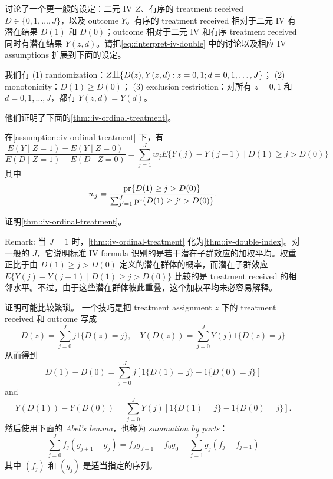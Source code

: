 \citet{angrist1995two} 讨论了一个更一般的设定：二元 IV $Z$、有序的 treatment received $D \in \{0,1,\ldots, J\}$，以及 outcome $Y$。有序的 treatment received 相对于二元 IV 有潜在结果 $D(1)$ 和 $D(0)$；outcome 相对于二元 IV 和有序 treatment received 同时有潜在结果 $Y(z,d)$。请把\cref{eq::interpret-iv-double} 中的讨论以及相应 IV assumptions 扩展到下面的设定。

\begin{assumption}\label{assumption::iv-ordinal-treatment}
我们有
(1) randomization：$Z\ind \{   D(z),  Y(z,d)  : z=0,1; d = 0,1,\ldots, J \}$；
(2) monotonicity：$D(1) \geq D(0)$；
(3) exclusion restriction：对所有 $z=0,1$ 和 $ d = 0,1,\ldots, J $，都有 $Y(z,d) = Y(d)$。
\end{assumption}

他们证明了下面的\cref{thm::iv-ordinal-treatment}。

\begin{theorem}\label{thm::iv-ordinal-treatment}
在\cref{assumption::iv-ordinal-treatment} 下，有
$$
\frac{  E(Y\mid Z=1) - E(Y\mid Z=0) }{ E(D\mid Z=1) - E(D\mid Z=0)  }
= \sum_{j=1}^J  w_j E\{  Y(j) - Y(j-1)  \mid D(1) \geq j > D(0) \}
$$
其中
$$
w_j = \frac{   \textup{pr}\{  D(1) \geq j > D(0)   \}   }{   \sum_{j'=1}^J  \textup{pr}\{  D(1) \geq j' > D(0)   \}   }.
$$
\end{theorem}



证明\cref{thm::iv-ordinal-treatment}。

Remark: 
当 $J=1$ 时，\cref{thm::iv-ordinal-treatment} 化为\cref{thm::iv-double-index}。对一般的 $J$，它说明标准 IV formula 识别的是若干潜在子群效应的加权平均。权重正比于由 $  D(1) \geq j > D(0) $ 定义的潜在群体的概率，而潜在子群效应 $E\{  Y(j) - Y(j-1)  \mid D(1) \geq j > D(0) \}$ 比较的是 treatment received 的相邻水平。不过，由于这些潜在群体彼此重叠，这个加权平均未必容易解释。



证明可能比较繁琐。
一个技巧是把 treatment assignment $z$ 下的 treatment received 和 outcome 写成
$$
D(z) = \sum_{j=0}^J j 1\{ D(z) = j\} ,\quad 
Y(D(z)) = \sum_{j=0}^J  Y(j)1\{ D(z) = j\} 
$$
从而得到
$$
D(1) - D(0) = \sum_{j=0}^J j [ 1\{ D(1) = j\} -1\{ D(0) = j\} ]
$$
and
$$
 Y(D(1))  - Y(D(0))   = 
\sum_{j=0}^J Y(j)   [ 1\{ D(1) = j \}   - 1\{ D(0) = j \}  ].
$$
然后使用下面的 {\it Abel's lemma}，也称为 {\it summation by parts}：
$$
\sum_{j=0}^J  f_j (g_{j+1} - g_j) 
= 
f_J g_{J+1} - f_0 g_0  - \sum_{j=1}^J g_j  (f_j - f_{j-1})
$$
其中 $(f_j)$ 和 $(g_j)$ 是适当指定的序列。





